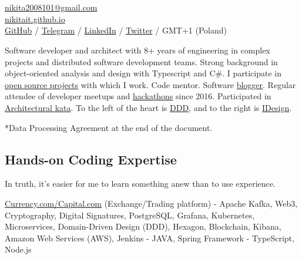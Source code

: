 \documentclass{yb}
\begin{document}
\ybPrintPhoto{}

\section*{\Large {}}

\href{mailto:nikita2008101@gmail.com}{nikita2008101@gmail.com}\\%
\href{https://nikitait.github.io/}{nikitait.github.io}\\%
\href{https://github.com/nikitait}{GitHub} /
\href{https://t.me/NonNikita}{Telegram} /
\href{https://www.linkedin.com/in/nikita-fedorov-041243126}{LinkedIn} /
\href{https://twitter.com/intent/follow?screen_name=Nikita_Fiodorov}{Twitter} / GMT+1 (Poland)
\vspace*{12pt}

Software developer and architect with
8+ years of engineering in complex projects and distributed software
development teams. Strong background in object-oriented analysis and design
with Typescript and C\#. I participate in \href{https://github.com/nikitait}{open source projects} with which I work. Code mentor. Software
\href{https://nikitait.github.io}{blogger}. Regular attendee of developer meetups and \href{https://www.youtube.com/watch?v=gVKDU043EWI&t=1s&ab_channel=EPAMSaint-Petersburg}{hackathons} since 2016. Participated in \href{
https://www.youtube.com/watch?v=Qu3g_eiY4XA&ab_channel=%
}{Architectural kata}. To the left of the heart is \href{https://github.com/ddd-crew}{DDD}, and to the right is \href{https://www.idesign.net/}{IDesign}.

*Data Processing Agreement at the end of the document.

\subsection*{Hands-on Coding Expertise}

In truth, it's easier for me to learn something anew than to use experience.



\href{https://currency.com/}{Currency.com/Capital.com} (Exchange/Trading platform)
\newline - Apache Kafka, Web3, Cryptography, Digital Signatures, PostgreSQL, Grafana, Kubernetes, Microservices, Domain-Driven Design (DDD), Hexagon, Blockchain, Kibana, Amazon Web Services (AWS), Jenkins
\newline - JAVA, Spring Framework
\newline - TypeScript, Node.js
\end{document}
